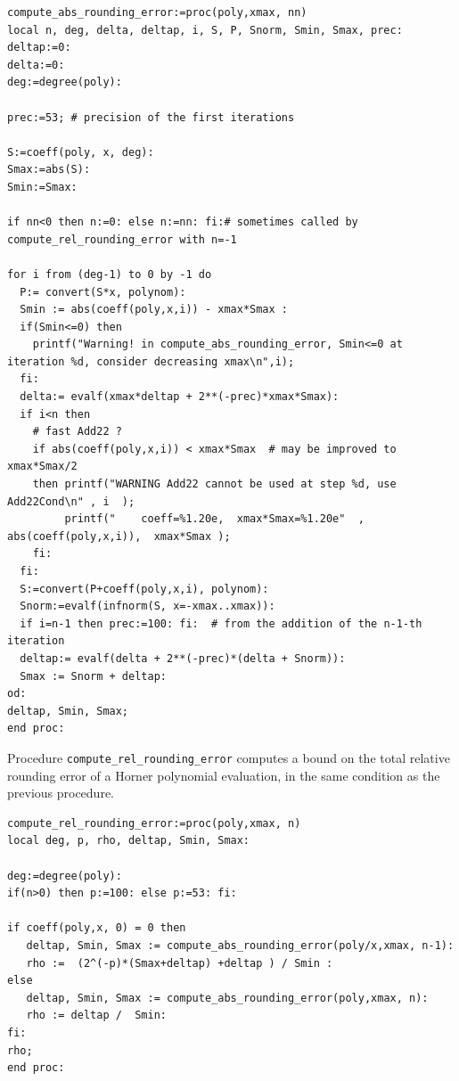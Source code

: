 \begin{lstlisting}[caption={compute\_abs\_rounding\_error},firstnumber=1]
compute_abs_rounding_error:=proc(poly,xmax, nn)
local n, deg, delta, deltap, i, S, P, Snorm, Smin, Smax, prec:
deltap:=0:
delta:=0:
deg:=degree(poly):

prec:=53; # precision of the first iterations

S:=coeff(poly, x, deg):
Smax:=abs(S):
Smin:=Smax:

if nn<0 then n:=0: else n:=nn: fi:# sometimes called by compute_rel_rounding_error with n=-1

for i from (deg-1) to 0 by -1 do
  P:= convert(S*x, polynom):
  Smin := abs(coeff(poly,x,i)) - xmax*Smax : 
  if(Smin<=0) then 
    printf("Warning! in compute_abs_rounding_error, Smin<=0 at iteration %d, consider decreasing xmax\n",i);
  fi:
  delta:= evalf(xmax*deltap + 2**(-prec)*xmax*Smax):
  if i<n then 
    # fast Add22 ?    
    if abs(coeff(poly,x,i)) < xmax*Smax  # may be improved to xmax*Smax/2
    then printf("WARNING Add22 cannot be used at step %d, use Add22Cond\n" , i  );   
         printf("    coeff=%1.20e,  xmax*Smax=%1.20e"  ,  abs(coeff(poly,x,i)),  xmax*Smax );
    fi:
  fi:
  S:=convert(P+coeff(poly,x,i), polynom):
  Snorm:=evalf(infnorm(S, x=-xmax..xmax)):
  if i=n-1 then prec:=100: fi:  # from the addition of the n-1-th iteration
  deltap:= evalf(delta + 2**(-prec)*(delta + Snorm)): 
  Smax := Snorm + deltap:  
od:
deltap, Smin, Smax;
end proc:
\end{lstlisting}
\vspace{0.5cm}

Procedure \texttt{compute\_rel\_rounding\_error} computes a bound on
the total relative rounding error of a Horner polynomial evaluation,
in the same condition as the previous procedure.

\begin{lstlisting}[caption={compute\_abs\_rounding\_error},firstnumber=1]
compute_rel_rounding_error:=proc(poly,xmax, n)
local deg, p, rho, deltap, Smin, Smax:

deg:=degree(poly):
if(n>0) then p:=100: else p:=53: fi: 

if coeff(poly,x, 0) = 0 then
   deltap, Smin, Smax := compute_abs_rounding_error(poly/x,xmax, n-1):
   rho :=  (2^(-p)*(Smax+deltap) +deltap ) / Smin :
else
   deltap, Smin, Smax := compute_abs_rounding_error(poly,xmax, n):
   rho := deltap /  Smin:
fi:
rho;
end proc:
\end{lstlisting}
\vspace{0.5cm}

